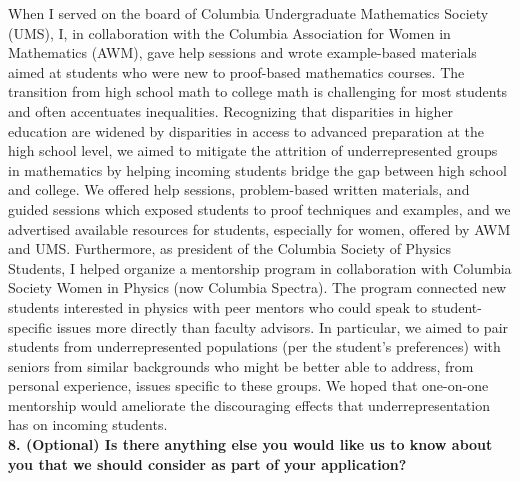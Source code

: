 \documentclass[11pt]{article}
\begin{document}
When I served on the board of Columbia Undergraduate Mathematics Society (UMS), I, in collaboration with the Columbia Association for Women in Mathematics (AWM), gave help sessions and wrote example-based materials aimed at students who were new to proof-based mathematics courses. The transition from high school math to college math is challenging for most students and often accentuates inequalities. Recognizing that disparities in higher education are widened by disparities in access to advanced preparation at the high school level, we aimed to mitigate the attrition of underrepresented groups in mathematics by helping incoming students bridge the gap between high school and college. We offered help sessions, problem-based written materials, and guided sessions which exposed students to proof techniques and examples, and we advertised available resources for students, especially for women, offered by AWM and UMS. Furthermore, as president of the Columbia Society of Physics Students, I helped organize a mentorship program in collaboration with Columbia Society Women in Physics (now Columbia Spectra). The program connected new students interested in physics with peer mentors who could speak to student-specific issues more directly than faculty advisors. In particular, we aimed to pair students from underrepresented populations (per the student's preferences) with seniors from similar backgrounds who might be better able to address, from personal experience, issues specific to these groups. We hoped that one-on-one mentorship would ameliorate the discouraging effects that underrepresentation has on incoming students. 
\bigskip\\
\noindent \textbf{8. (Optional) Is there anything else you would like us to know about you that we should consider as part of your application?}
\bigskip\\
\end{document}
